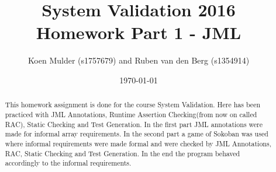 \documentclass[a4paper]{article}
\title{System Validation 2016 \\ Homework Part 1 - JML}
\author{Koen Mulder (s1757679) and Ruben van den Berg (s1354914)}
\date{\today}
\begin{document}
\maketitle

\begin{abstract}
This homework assignment is done for the course System Validation. Here has been practiced with JML Annotations, Runtime Assertion Checking(from now on called RAC), Static Checking and Test Generation. In the first part JML annotations were made for informal array requirements. In the second part a game of Sokoban was used where informal requirements were made formal and were checked by JML Annotations, RAC, Static Checking and Test Generation. In the end the program behaved accordingly to the informal requirements. 
\end{abstract}
\end{document}
